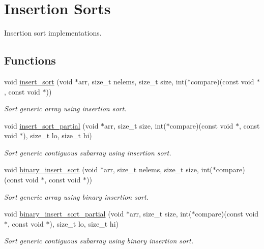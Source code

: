 \hypertarget{group__InsertionSort}{}\section{Insertion Sorts}
\label{group__InsertionSort}


Insertion sort implementations.  


\subsection*{Functions}
\begin{DoxyCompactItemize}
\item 
void \hyperlink{group__InsertionSort_ga262ca6566c76d4587cba88441880a293}{insert\+\_\+sort} (void $\ast$arr, size\+\_\+t nelems, size\+\_\+t size, int($\ast$compare)(const void $\ast$, const void $\ast$))
\begin{DoxyCompactList}\small\item\em Sort generic array using insertion sort. \end{DoxyCompactList}\item 
void \hyperlink{group__InsertionSort_gad147d05ac7625135f328ce4924ac2553}{insert\+\_\+sort\+\_\+partial} (void $\ast$arr, size\+\_\+t size, int($\ast$compare)(const void $\ast$, const void $\ast$), size\+\_\+t lo, size\+\_\+t hi)
\begin{DoxyCompactList}\small\item\em Sort generic contiguous subarray using insertion sort. \end{DoxyCompactList}\item 
void \hyperlink{group__InsertionSort_ga53e65861396bb4c67c0142dd41374727}{binary\+\_\+insert\+\_\+sort} (void $\ast$arr, size\+\_\+t nelems, size\+\_\+t size, int($\ast$compare)(const void $\ast$, const void $\ast$))
\begin{DoxyCompactList}\small\item\em Sort generic array using binary insertion sort. \end{DoxyCompactList}\item 
void \hyperlink{group__InsertionSort_gaa1e9e7c741dc66065d4ce604ad02f38c}{binary\+\_\+insert\+\_\+sort\+\_\+partial} (void $\ast$arr, size\+\_\+t size, int($\ast$compare)(const void $\ast$, const void $\ast$), size\+\_\+t lo, size\+\_\+t hi)
\begin{DoxyCompactList}\small\item\em Sort generic contiguous subarray using binary insertion sort. \end{DoxyCompactList}\end{DoxyCompactItemize}


